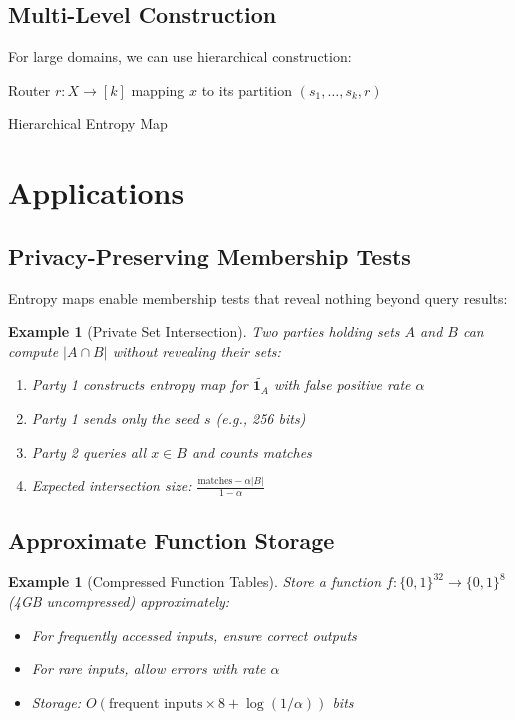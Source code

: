 \documentclass[11pt,final,hidelinks]{article}
\newtheorem{example}[theorem]{Example}
\newcommand{\obs}[1]{\widetilde{#1}}  %
\newcommand{\Indicator}[1]{\mathbf{1}_{#1}}
\newcommand{\Card}[1]{\lvert#1\rvert}
\newcommand{\fprate}{\alpha}
\begin{document}
\subsection{Multi-Level Construction}

For large domains, we can use hierarchical construction:

\begin{algorithm}[H]
\SetAlgoLined
{}
Router $r: X \to [k]$ mapping $x$ to its partition\;
\Return $(s_1, \ldots, s_k, r)$\;
\caption{Hierarchical Entropy Map}
\end{algorithm}

\section{Applications}

\subsection{Privacy-Preserving Membership Tests}

Entropy maps enable membership tests that reveal nothing beyond query results:

\begin{example}[Private Set Intersection]
Two parties holding sets $A$ and $B$ can compute $\Card{A \cap B}$ without revealing their sets:
\begin{enumerate}
    \item Party 1 constructs entropy map for $\obs{\Indicator{A}}$ with false positive rate $\fprate$
    \item Party 1 sends only the seed $s$ (e.g., 256 bits)
    \item Party 2 queries all $x \in B$ and counts matches
    \item Expected intersection size: $\frac{\text{matches} - \fprate \Card{B}}{1 - \fprate}$
\end{enumerate}
\end{example}

\subsection{Approximate Function Storage}

\begin{example}[Compressed Function Tables]
Store a function $f: \{0,1\}^{32} \to \{0,1\}^8$ (4GB uncompressed) approximately:
\begin{itemize}
    \item For frequently accessed inputs, ensure correct outputs
    \item For rare inputs, allow errors with rate $\fprate$
    \item Storage: $O(\text{frequent inputs} \times 8 + \log(1/\fprate))$ bits
\end{itemize}
\end{example}
\end{document}
